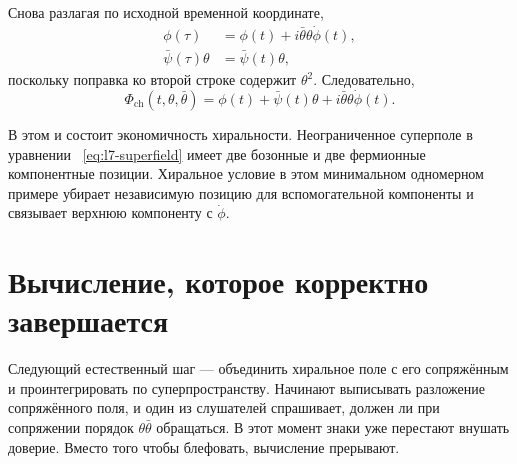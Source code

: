 Снова разлагая по исходной временной координате,
\begin{align}
\phi(\tau)
&=\phi(t)+i\bar\theta\theta\dot\phi(t),\\
\bar\psi(\tau)\theta
&=\bar\psi(t)\theta,
\end{align}
поскольку поправка ко второй строке содержит \(\theta^2\). Следовательно,
\begin{equation}
\Phi_{\mathrm{ch}}(t,\theta,\bar\theta)
=\phi(t)+\bar\psi(t)\theta
+i\bar\theta\theta\dot\phi(t).
\label{eq:l7-chiral-field-components}
\end{equation}

\begin{classroomqa}
\end{classroomqa}

В этом и состоит экономичность хиральности. Неограниченное суперполе в уравнении ~\eqref{eq:l7-superfield} имеет две бозонные и две фермионные компонентные позиции. Хиральное условие в этом минимальном одномерном примере убирает независимую позицию для вспомогательной компоненты и связывает верхнюю компоненту с \(\dot\phi\).

\section{Вычисление, которое корректно завершается}

Следующий естественный шаг — объединить хиральное поле с его сопряжённым и проинтегрировать по суперпространству. Начинают выписывать разложение сопряжённого поля, и один из слушателей спрашивает, должен ли при сопряжении порядок \(\theta\bar\theta\) обращаться. В этот момент знаки уже перестают внушать доверие. Вместо того чтобы блефовать, вычисление прерывают.

\begin{classroomqa}
\end{classroomqa}

